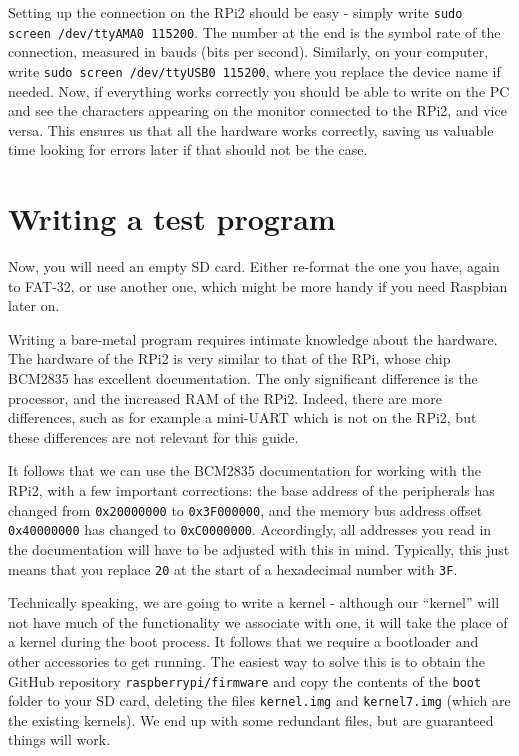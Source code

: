 \documentclass[a4paper,11pt,reqno]{amsart}
\begin{document}
Setting up the connection on the RPi2 should be easy - simply write \texttt{sudo screen /dev/ttyAMA0 115200}. The number at the end is the symbol rate of the connection, measured in bauds (bits per second). Similarly, on your computer, write \texttt{sudo screen /dev/ttyUSB0 115200}, where you replace the device name if needed. Now, if everything works correctly you should be able to write on the PC and see the characters appearing on the monitor connected to the RPi2, and vice versa. This ensures us that all the hardware works correctly, saving us valuable time looking for errors later if that should not be the case.

\section{Writing a test program}
Now, you will need an empty SD card. Either re-format the one you have, again to FAT-32, or use another one, which might be more handy if you need Raspbian later on.

Writing a bare-metal program requires intimate knowledge about the hardware. The hardware of the RPi2 is very similar to that of the RPi, whose chip BCM2835 has excellent documentation. The only significant difference is the processor, and the increased RAM of the RPi2. Indeed, there are more differences, such as for example a mini-UART which is not on the RPi2, but these differences are not relevant for this guide.

It follows that we can use the BCM2835 documentation for working with the RPi2, with a few important corrections: the base address of the peripherals has changed from \texttt{0x20000000} to \texttt{0x3F000000}, and the memory bus address offset \texttt{0x40000000} has changed to \texttt{0xC0000000}. Accordingly, all addresses you read in the documentation will have to be adjusted with this in mind. Typically, this just means that you replace \texttt{20} at the start of a hexadecimal number with \texttt{3F}.

Technically speaking, we are going to write a kernel -  although our ``kernel'' will not have much of the functionality we associate with one, it will take the place of a kernel during the boot process. It follows that we require a bootloader and other accessories to get running. The easiest way to solve this is to obtain the GitHub repository \texttt{raspberrypi/firmware} and copy the contents of the \texttt{boot} folder to your SD card, deleting the files \texttt{kernel.img} and \texttt{kernel7.img} (which are the existing kernels). We end up with some redundant files, but are guaranteed things will work.
\end{document}
